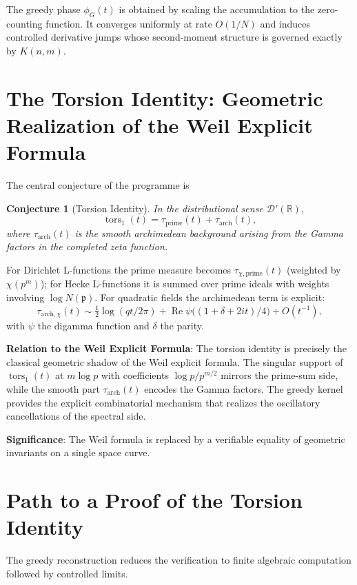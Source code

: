 \documentclass[11pt,a4paper]{article}
\newtheorem{conjecture}[theorem]{Conjecture}
\begin{document}
The greedy phase \(\phi_G(t)\) is obtained by scaling the accumulation to the zero-counting function. It converges uniformly at rate \(O(1/N)\) and induces controlled derivative jumps whose second-moment structure is governed exactly by \(K(n,m)\).

\section{The Torsion Identity: Geometric Realization of the Weil Explicit Formula}

The central conjecture of the programme is

\begin{conjecture}[Torsion Identity]
In the distributional sense \(\mathcal{D}'(\mathbb{R})\),
\[
\operatorname{tors}_1(t) = \tau_{\mathrm{prime}}(t) + \tau_{\mathrm{arch}}(t),
\]
where \(\tau_{\mathrm{arch}}(t)\) is the smooth archimedean background arising from the Gamma factors in the completed zeta function.
\end{conjecture}

For Dirichlet L-functions the prime measure becomes \(\tau_{\chi,\mathrm{prime}}(t)\) (weighted by \(\chi(p^m)\)); for Hecke L-functions it is summed over prime ideals with weights involving \(\log N(\mathfrak{p})\). For quadratic fields the archimedean term is explicit:
\[
\tau_{\mathrm{arch},\chi}(t) \sim \tfrac12\log(qt/2\pi) + \operatorname{Re}\psi\bigl((1+\delta+2it)/4\bigr) + O(t^{-1}),
\]
with \(\psi\) the digamma function and \(\delta\) the parity.

\textbf{Relation to the Weil Explicit Formula}: The torsion identity is precisely the classical geometric shadow of the Weil explicit formula. The singular support of \(\operatorname{tors}_1(t)\) at \(m\log p\) with coefficients \(\log p/p^{m/2}\) mirrors the prime-sum side, while the smooth part \(\tau_{\mathrm{arch}}(t)\) encodes the Gamma factors. The greedy kernel provides the explicit combinatorial mechanism that realizes the oscillatory cancellations of the spectral side.

\textbf{Significance}: The Weil formula is replaced by a verifiable equality of geometric invariants on a single space curve.

\section{Path to a Proof of the Torsion Identity}

The greedy reconstruction reduces the verification to finite algebraic computation followed by controlled limits.
\end{document}
